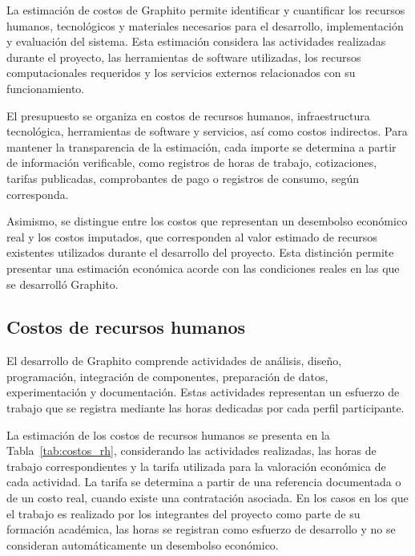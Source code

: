 La estimación de costos de Graphito permite identificar y cuantificar los recursos humanos, tecnológicos y materiales necesarios para el desarrollo, implementación y evaluación del sistema. Esta estimación considera las actividades realizadas durante el proyecto, las herramientas de software utilizadas, los recursos computacionales requeridos y los servicios externos relacionados con su funcionamiento.

El presupuesto se organiza en costos de recursos humanos, infraestructura tecnológica, herramientas de software y servicios, así como costos indirectos. Para mantener la transparencia de la estimación, cada importe se determina a partir de información verificable, como registros de horas de trabajo, cotizaciones, tarifas publicadas, comprobantes de pago o registros de consumo, según corresponda.

Asimismo, se distingue entre los costos que representan un desembolso económico real y los costos imputados, que corresponden al valor estimado de recursos existentes utilizados durante el desarrollo del proyecto. Esta distinción permite presentar una estimación económica acorde con las condiciones reales en las que se desarrolló Graphito.

\subsection{Costos de recursos humanos}

El desarrollo de Graphito comprende actividades de análisis, diseño, programación, integración de componentes, preparación de datos, experimentación y documentación. Estas actividades representan un esfuerzo de trabajo que se registra mediante las horas dedicadas por cada perfil participante.

La estimación de los costos de recursos humanos se presenta en la Tabla~\ref{tab:costos_rh}, considerando las actividades realizadas, las horas de trabajo correspondientes y la tarifa utilizada para la valoración económica de cada actividad. La tarifa se determina a partir de una referencia documentada o de un costo real, cuando existe una contratación asociada. En los casos en los que el trabajo es realizado por los integrantes del proyecto como parte de su formación académica, las horas se registran como esfuerzo de desarrollo y no se consideran automáticamente un desembolso económico.

